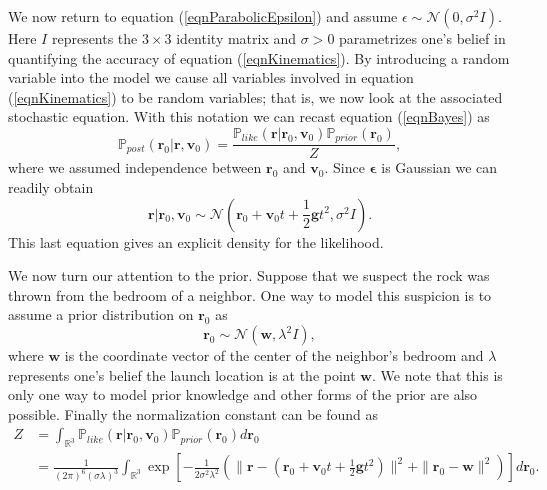 \documentclass{sfuthesis}
\newcommand{\post}{\mathbb{P}_{post}}
\newcommand{\like}{\mathbb{P}_{like}}
\newcommand{\prior}{\mathbb{P}_{prior}}
\newcommand{\p}{\mathbb{P}}
\begin{document}
We now return to equation (\ref{eqnParabolicEpsilon}) and assume $\epsilon\sim\mathcal{N}(0,\sigma^{2}I)$.
Here $I$
represents the $3\times 3$ identity matrix and $\sigma>0$ parametrizes one's belief in quantifying the 
accuracy  
of equation (\ref{eqnKinematics}).  By introducing a random variable into the model
we cause all variables involved  in equation (\ref{eqnKinematics})
to be  random variables; that is, we now look at the  associated stochastic equation. With this notation
we can recast equation (\ref{eqnBayes}) as  
\begin{equation}\label{eqnpostrock}
\post(\textbf{r}_{0}|\textbf{r},\textbf{v}_{0})=\frac{\like(\textbf{r}|\textbf{r}_{0},\textbf{v}_{0})
\prior(\textbf{r}_{0})}{Z},
\end{equation}
where we assumed independence between $\textbf{r}_{0}$ and $\textbf{v}_{0}$.
Since $\mathbf{\epsilon}$ is Gaussian we can readily obtain \cite{Somersalo}
\begin{equation*}
\textbf{r}|\textbf{r}_{0},\textbf{v}_{0}\sim \mathscr{N}(\textbf{r}_{0}+\textbf{v}_{0}t+\frac{1}{2}\textbf{g}t^{2}
,\sigma^{2} I).
\end{equation*}
This last equation gives an explicit density for the likelihood. 

We now turn our attention to  the prior.
Suppose that we suspect the rock was thrown from the bedroom of a neighbor.
 One way to model this suspicion is to assume a prior distribution on $\textbf{r}_{0}$ as
\begin{equation*}
\textbf{r}_{0}\sim\mathscr{N}(\textbf{w},\lambda^{2} I),
\end{equation*}
where $\textbf{w}$ is the coordinate vector of the center of  the neighbor's bedroom and $\lambda$ represents 
one's belief the launch location is at the point $\textbf{w}$. We note that  this is only one way to model 
 prior knowledge and other forms of the prior are also possible. Finally the normalization constant
can be found as
\begin{align*}
Z&=\int_{\mathbb{R}^{3}}\like(\textbf{r}|\textbf{r}_{0},\textbf{v}_{0})
\prior(\textbf{r}_{0})d\textbf{r}_{0}\\
&= \frac{1}{(2\pi)^{6}(\sigma\lambda)^{3}}\int_{\mathbb{R}^{3}}
\exp\left[-\frac{1}{2\sigma^{2}\lambda^{2}}
\left(\|\textbf{r}-(\textbf{r}_{0}+\textbf{v}_{0}t+\frac{1}{2}\textbf{g}t^{2})\|^{2}
+\|\textbf{r}_{0}-\textbf{w}\|^{2}\right)\right]d\textbf{r}_{0}.
\end{align*}
\end{document}
